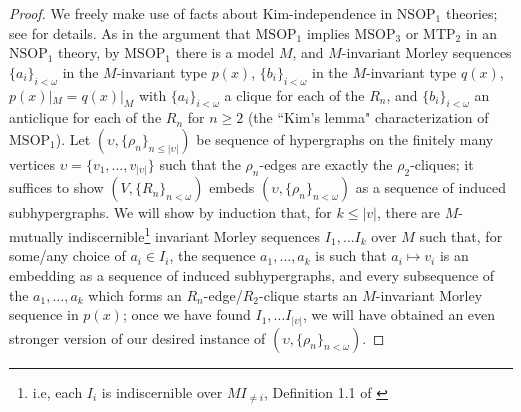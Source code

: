\documentclass{article}
\theoremstyle{definition}
\theoremstyle{definition}
\theoremstyle{definition}
\begin{document}
\begin{proof}

We freely make use of facts about Kim-independence in $\mathrm{NSOP}_{1}$ theories; see \cite{kaplanramsey2017kim} for details. As in the argument that $\mathrm{MSOP}_{1}$ implies $\mathrm{MSOP}_{3}$ or $\mathrm{MTP}_{2}$ in an $\mathrm{NSOP}_{1}$ theory, by $\mathrm{MSOP}_{1}$ there is a model $M$, and $M$-invariant Morley sequences $\{a_{i}\}_{i < \omega}$ in the $M$-invariant type $p(x)$, $\{b_{i}\}_{i < \omega}$ in the $M$-invariant type $q(x)$, $p(x)|_{M}=q(x)|_{M}$ with $\{a_{i}\}_{i < \omega}$ a clique for each of the $R_{n}$, and $\{b_{i}\}_{i < \omega}$ an anticlique for each of the $R_{n}$ for $n \geq 2$ (the ``Kim's lemma" characterization of $\mathrm{MSOP}_{1}$). Let $(\upsilon, \{\rho_{n}\}_{n \leq |\upsilon|})$ be sequence of hypergraphs on the finitely many vertices $\upsilon=\{v_{1}, \ldots, v_{|\upsilon|}\}$ such that the $\rho_{n}$-edges are exactly the $\rho_{2}$-cliques; it suffices to show $(V,\{R_{n}\}_{n < \omega})$ embeds $(\upsilon, \{\rho_{n}\}_{n < \omega})$ as a sequence of induced subhypergraphs. We will show by induction that, for $k \leq |v|$, there are $M$-mutually indiscernible\footnote{i.e, each $I_{i}$ is indiscernible over $MI_{\neq i}$, Definition 1.1 of \cite{chernikov2014theories}} invariant Morley sequences $I_{1}, \ldots I_{k}$ over $M$ such that, for some/any choice of $a_{i} \in I_{i}$, the sequence $a_{1}, \ldots, a_{k}$ is such that $a_{i} \mapsto v_{i}$ is an embedding as a sequence of induced subhypergraphs, and every subsequence of the $a_{1}, \ldots, a_{k}$ which forms an $R_{n}$-edge/$R_{2}$-clique starts an $M$-invariant Morley sequence in $p(x)$; once we have found $I_{1}, \ldots I_{|\upsilon|}$, we will have obtained an even stronger version of our desired instance of $(\upsilon, \{\rho_{n}\}_{n < \omega})$.


\end{proof}
\end{document}
